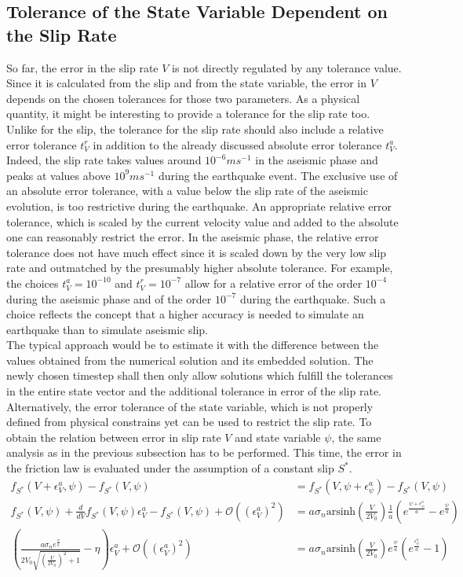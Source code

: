 \documentclass{report}
\begin{document}
\subsection{Tolerance of the State Variable Dependent on the Slip Rate}
So far, the error in the slip rate $V$ is not directly regulated by any tolerance value. Since it is calculated from the slip and from the state variable, the error in $V$ depends on the chosen tolerances for those two parameters. As a physical quantity, it might be interesting to provide a tolerance for the slip rate too. Unlike for the slip, the tolerance for the slip rate should also include a relative error tolerance $t_V^r$ in addition to the already discussed absolute error tolerance $t_V^a$. Indeed, the slip rate takes values around $10^{-6}ms^{-1}$ in the aseismic phase and peaks at values above $10^{9}ms^{-1}$ during the earthquake event. The exclusive use of an absolute error tolerance, with a value below the slip rate of the aseismic evolution, is too restrictive during the earthquake. An appropriate relative error tolerance, which is scaled by the current velocity value and added to the absolute one can reasonably restrict the error. In the aseismic phase, the relative error tolerance does not have much effect since it is scaled down by the very low slip rate and outmatched by the presumably higher absolute tolerance. For example, the choices $t_V^a=10^{-10}$ and $t_V^r=10^{-7}$ allow for a relative error of the order $10^{-4}$ during the aseismic phase and of the order $10^{-7}$ during the earthquake. Such a choice reflects the concept that a higher accuracy is needed to simulate an earthquake than to simulate aseismic slip. \\
The typical approach would be to estimate it with the difference between the values obtained from the numerical solution and its embedded solution. The newly chosen timestep shall then only allow solutions which fulfill the tolerances in the entire state vector and the additional tolerance in error of the slip rate. Alternatively, the error tolerance of the state variable, which is not properly defined from physical constrains yet can be used to restrict the slip rate. To obtain the relation between error in slip rate $V$ and state variable $\psi$, the same analysis as in the previous subsection has to be performed. This time, the error in the friction law is evaluated under the assumption of a constant slip $S^*$.  
\begin{align}
	f_{S^*}(V+\epsilon_V^a,\psi) - f_{S^*}(V,\psi) &= f_{S^*}(V,\psi+\epsilon_\psi^a) - f_{S^*}(V,\psi) \\
	 f_{S^*}(V,\psi) + \frac{d}{dV}f_{S^*}(V,\psi)\epsilon_V^a - f_{S^*}(V,\psi) + \mathcal{O}\left(\left(\epsilon_V^a\right)^2\right)&= a \sigma_n \text{arsinh}\left(\frac{V}{2V_0}\right)\frac{1}{a}\left(e^{\frac{\psi+\epsilon_\psi^a}{a}} - e^{\frac{\psi}{a}}\right) \\
	 \left( \frac{a\sigma_ne^{\frac{\psi}{a}}} {2V_0\sqrt{\left(\frac{V}{2V_0}\right)^2+1}}- \eta \right)\epsilon_V^a + \mathcal{O}\left(\left(\epsilon_V^a\right)^2\right) &= a \sigma_n \text{arsinh}\left(\frac{V}{2V_0}\right) e^{\frac{\psi}{a}}\left(e^{\frac{\epsilon_\psi^a}{a}} - 1\right)
\end{align}
\end{document}
